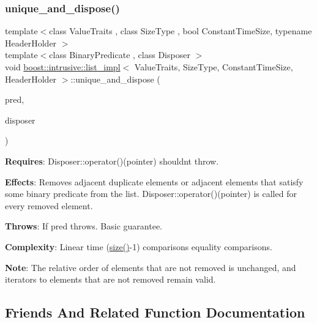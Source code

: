 \subsubsection{\texorpdfstring{unique\+\_\+and\+\_\+dispose()}{unique\_and\_dispose()}\hspace{0.1cm}{\footnotesize\ttfamily [2/2]}}
{\footnotesize\ttfamily template$<$class Value\+Traits , class Size\+Type , bool Constant\+Time\+Size, typename Header\+Holder $>$ \\
template$<$class Binary\+Predicate , class Disposer $>$ \\
void \hyperlink{classboost_1_1intrusive_1_1list__impl}{boost\+::intrusive\+::list\+\_\+impl}$<$ Value\+Traits, Size\+Type, Constant\+Time\+Size, Header\+Holder $>$\+::unique\+\_\+and\+\_\+dispose (\begin{DoxyParamCaption}\item[{Binary\+Predicate}]{pred,  }\item[{Disposer}]{disposer }\end{DoxyParamCaption})\hspace{0.3cm}{\ttfamily [inline]}}

{\bfseries Requires}\+: Disposer\+::operator()(pointer) shouldn\textquotesingle{}t throw.

{\bfseries Effects}\+: Removes adjacent duplicate elements or adjacent elements that satisfy some binary predicate from the list. Disposer\+::operator()(pointer) is called for every removed element.

{\bfseries Throws}\+: If pred throws. Basic guarantee.

{\bfseries Complexity}\+: Linear time (\hyperlink{classboost_1_1intrusive_1_1list__impl_a9da0074a31566f3a7dbc3cd1a2d752c1}{size()}-\/1) comparisons equality comparisons.

{\bfseries Note}\+: The relative order of elements that are not removed is unchanged, and iterators to elements that are not removed remain valid. 

\subsection{Friends And Related Function Documentation}
\mbox{\label{classboost_1_1intrusive_1_1list__impl_ad1f3207f2a89bfb5ee38f1cd6114bf94}} 
